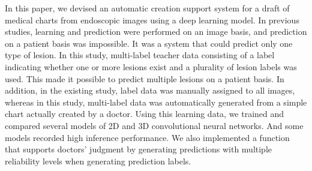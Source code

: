 In this paper, we devised an automatic creation support system for a draft of medical charts from endoscopic images using a deep learning model.
In previous studies, learning and prediction were performed on an image basis, and prediction on a patient basis was impossible.
It was a system that could predict only one type of lesion.
In this study, multi-label teacher data consisting of a label indicating whether one or more lesions exist and a plurality of lesion labels was used.
This made it possible to predict multiple lesions on a patient basis.
In addition, in the existing study, label data was manually assigned to all images, whereas in this study, multi-label data was automatically generated from a simple chart actually created by a doctor.
Using this learning data, we trained and compared several models of 2D and 3D convolutional neural networks. And some models recorded high inference performance.
We also implemented a function that supports doctors' judgment by generating predictions with multiple reliability levels when generating prediction labels.
